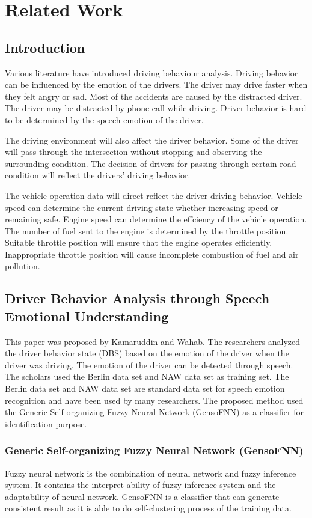 \chapter{Related Work}
\section{Introduction}
Various literature have introduced driving behaviour analysis. Driving behavior can be influenced by the emotion of the drivers. The driver may drive faster when they felt angry or sad. Most of the accidents are caused by the distracted driver. The driver may be distracted by phone call while driving. Driver behavior is hard to be determined by the speech emotion of the driver.\cite{kamaruddin:wahab:2010}

The driving environment will also affect the driver behavior. Some of the driver will pass through the intersection without stopping and observing the surrounding condition. The decision of drivers for passing through certain road condition will reflect the drivers' driving behavior.

The vehicle operation data will direct reflect the driver driving behavior. Vehicle speed can determine the current driving state whether increasing speed or remaining safe. Engine speed can determine the effciency of the vehicle operation. The number of fuel sent to the engine is determined by the throttle position. Suitable throttle position will ensure that the engine operates efficiently. Inappropriate throttle position will cause incomplete combustion of fuel and air pollution.\cite{chen:pan:lu:2015}   

\section{Driver Behavior Analysis through Speech Emotional Understanding}
This paper was proposed by Kamaruddin and Wahab\citeyear{kamaruddin:wahab:2010}. The researchers analyzed the driver behavior state (DBS) based on the emotion of the driver when the driver was driving. The emotion of the driver can be detected through speech. 
The scholars used the Berlin data set and NAW data set as training set. The Berlin data set and NAW data set are standard data set for speech emotion recognition and have been used by many researchers.
The proposed method used the Generic Self-organizing Fuzzy Neural Network (GensoFNN) as a classifier for identification purpose. 
\subsection{Generic Self-organizing Fuzzy Neural Network (GensoFNN)}
Fuzzy neural network is the combination of neural network and fuzzy inference system. It contains the interpret-ability of fuzzy inference system and the adaptability of neural network. GensoFNN is a classifier that can generate consistent result as it is able to do self-clustering process of the training data.
